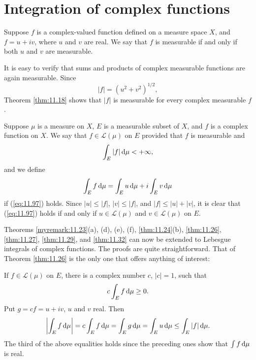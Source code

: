 
\section{Integration of complex functions}

Suppose $f$ is a complex-valued function defined on a measure space $X$,
and $f = u + iv$,
where $u$ and $v$ are real.
We say that $f$ is measurable if and only if
both $u$ and $v$ are measurable.

It is easy to verify that sums and products of complex measurable functions
are again measurable. Since
\begin{equation*}
    \left| f \right| = (u^2 + v^2)^{1/2},
\end{equation*}
Theorem \ref{thm:11.18} shows that $|f|$ is measurable for every complex measurable $f$.

Suppose $\mu$ is a measure on $X$,
$E$ is a measurable subset of $X$,
and $f$ is a complex function on $X$.
We say that $f \in \mathscr{L}(\mu)$ on $E$ provided that $f$ is measurable
and
\begin{equation}
    \label{eq:11.97}
    \int_E \left| f \right| \d \mu < +\infty ,
\end{equation}
and we define
\begin{equation*}
    \int_E f \d \mu =
    \int_E u \d \mu + i
    \int_E v \d \mu
\end{equation*}
if (\ref{eq:11.97}) holds.
Since $|u| \leq |f|$, $|v| \leq |f|$, and $|f | \leq | u | + | v |$,
it is clear that
(\ref{eq:11.97}) holds if and only if $u \in \mathscr{L}(\mu)$ and $v \in \mathscr{L}(\mu)$ on $E$.

Theorems \ref{myremark:11.23}(a), (d), (e), (f), \ref{thm:11.24}(b), \ref{thm:11.26}, \ref{thm:11.27}, \ref{thm:11.29}, and \ref{thm:11.32}
can now be extended to Lebesgue integrals of complex functions.
The proofs are quite straightforward.
That of Theorem \ref{thm:11.26} is the only one that offers
anything of interest:

If $f \in \mathscr{L}(\mu)$ on $E$, there is a complex number $c$, $|c| = 1$, such that
\begin{equation*}
    c \int_E f \d \mu \geq 0 .
\end{equation*}
Put $g = cf = u + iv$, $u$ and $v$ real.
Then
\begin{equation*}
    \left| \int_E f \d \mu \right| =
    c \int_E f \d \mu =
    \int_E g \d \mu =
    \int_E u \d \mu \leq
    \int_E | f | \d \mu .
\end{equation*}
The third of the above equalities holds since the preceding ones show that
$\int f \d \mu$ is real.
